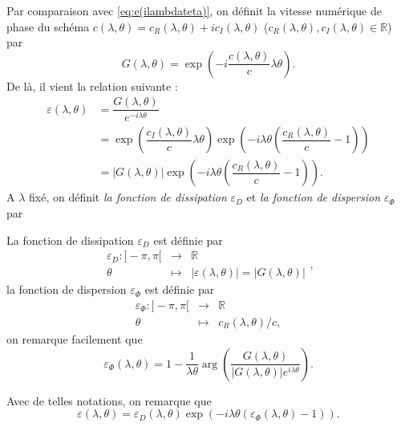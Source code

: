 Par comparaison avec \eqref{eq:e(ilambdateta)}, on définit la  vitesse numérique de phase du schéma $c(\lambda,\theta) = c_R(\lambda,\theta) + i c_I(\lambda,\theta)$ ($c_R(\lambda,\theta),c_I(\lambda,\theta) \in \mathbb{R}$) par
\begin{equation}
G(\lambda, \theta) = \exp \left( - i \dfrac{c(\lambda,\theta)}{c} \lambda \theta \right).
\end{equation}
De là, il vient la relation suivante :
\begin{align*}
\varepsilon(\lambda,\theta) & = \dfrac{G(\lambda,\theta)}{e^{- i \lambda \theta}} \\
	& = \exp \left( \dfrac{c_I(\lambda, \theta)}{c} \lambda \theta \right) \exp \left( - i \lambda \theta \left( \dfrac{c_R(\lambda, \theta)}{c} -1 \right) \right) \\
	& = |G(\lambda, \theta)| \exp \left( - i \lambda \theta \left( \dfrac{c_R(\lambda, \theta)}{c} -1 \right) \right).
\end{align*}
A $\lambda$ fixé, on définit \textit{la fonction de dissipation} $\varepsilon_D$ et \textit{ la fonction de dispersion} $\varepsilon_{\Phi}$ par

\begin{definition}
La fonction de dissipation $\varepsilon_D$ est définie par
\begin{equation}
\begin{array}{rcl}
\varepsilon_D : ]- \pi, \pi[ & \rightarrow & \mathbb{R} \\
\theta & \mapsto & |\varepsilon(\lambda,\theta)| = |G(\lambda, \theta)|
\end{array},
\end{equation}
la fonction de dispersion $\varepsilon_{\Phi}$ est définie par
\begin{equation}
\begin{array}{rcl}
\varepsilon_{\Phi} : ]- \pi, \pi[ & \rightarrow & \mathbb{R} \\
\theta & \mapsto & c_R(\lambda, \theta)/c,
\end{array}
\end{equation}
on remarque facilement que 
\begin{equation}
\varepsilon_{\Phi}(\lambda, \theta) = 1 - \dfrac{1}{\lambda \theta} \arg \left( \dfrac{G(\lambda, \theta)}{|G(\lambda,\theta)| e^{i \lambda \theta}} \right).
\end{equation}
\end{definition}

Avec de telles notations, on remarque que
\begin{equation}
\varepsilon(\lambda,\theta) = \varepsilon_D(\lambda,\theta) \exp \left( - i \lambda \theta \left( \varepsilon_{\Phi}(\lambda,\theta) -1 \right) \right).
\end{equation}

